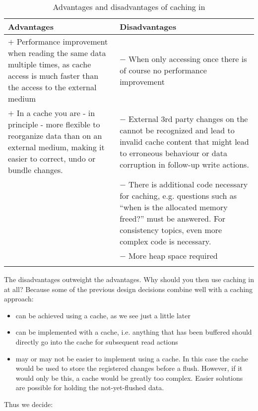 \begin{longtable}{|p{}|p{}|}
	\hline
	\rowcolor[gray]{.9}\textbf{Advantages} & \textbf{Disadvantages} \\
	\endhead
	\hline
	$+$ Performance improvement when reading the same data multiple times, as cache access is much faster than the access to the external medium & $-$ When only accessing once there is of course no performance improvement \\
	\hline
  $+$ In a cache you are - in principle - more flexible to reorganize data than on an external medium, making it easier to correct, undo or bundle changes. & $-$ External 3rd party changes on the \TERMmedium{} cannot be recognized and lead to invalid cache content that might lead to erroneous behaviour or data corruption in follow-up write actions. \\
	\hline
	 & $-$ There is additional code necessary for caching, e.g. questions such as ``when is the allocated memory freed?'' must be answered. For consistency topics, even more complex code is necessary.\\
	\hline
	 & $-$ More heap space required\\
	\hline
\caption{Advantages and disadvantages of caching in \LibName{}}
\label{tab:CachingProCon}
\end{longtable}

The disadvantages outweight the advantages. Why should you then use caching in \LibName{} at all? Because some of the previous design decisions combine well with a caching approach:
\begin{itemize}
\item {} can be achieved using a cache, as we see just a little later
\item {} can be implemented with a cache, i.e. anything that has been buffered should directly go into the cache for subsequent read actions
\item {} may or may not be easier to implement using a cache. In this case the cache would be used to store the registered changes before a flush. However, if it would only be this, a cache would be greatly too complex. Easier solutions are possible for holding the not-yet-flushed data.
\end{itemize}

Thus we decide:


